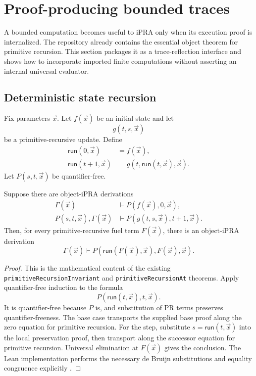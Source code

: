 \section{Proof-producing bounded traces}
\label{sec:traces}

A bounded computation becomes useful to iPRA only when its execution proof is internalized.  The repository already contains the essential object theorem for primitive recursion.  This section packages it as a trace-reflection interface and shows how to incorporate imported finite computations without asserting an internal universal evaluator.

\subsection{Deterministic state recursion}

Fix parameters \(\vec{x}\).  Let \(f(\vec{x})\) be an initial state and let
\[
 g(t,s,\vec{x})
\]
be a primitive-recursive update.  Define
\begin{align*}
 \mathsf{run}(0,\vec{x}) &= f(\vec{x}),\\
 \mathsf{run}(t+1,\vec{x}) &= g(t,\mathsf{run}(t,\vec{x}),\vec{x}).
\end{align*}
Let \(P(s,t,\vec{x})\) be quantifier-free.

\begin{theorem}
\label{thm:trace-invariant}
Suppose there are object-iPRA derivations
\begin{align*}
 \Gamma(\vec{x}) &\vdash P(f(\vec{x}),0,\vec{x}),\\
 P(s,t,\vec{x}),\Gamma(\vec{x})
 &\vdash P(g(t,s,\vec{x}),t+1,\vec{x}).
\end{align*}
Then, for every primitive-recursive fuel term \(F(\vec{x})\), there is an object-iPRA derivation
\[
 \Gamma(\vec{x})\vdash
 P(\mathsf{run}(F(\vec{x}),\vec{x}),F(\vec{x}),\vec{x}).
\]
\end{theorem}

\begin{proof}
This is the mathematical content of the existing \texttt{primitiveRecursionInvariant} and \texttt{primitiveRecursionAt} theorems.  Apply quantifier-free induction to the formula
\[
 P(\mathsf{run}(t,\vec{x}),t,\vec{x}).
\]
It is quantifier-free because \(P\) is, and substitution of PR terms preserves quantifier-freeness.  The base case transports the supplied base proof along the zero equation for primitive recursion.  For the step, substitute \(s=\mathsf{run}(t,\vec{x})\) into the local preservation proof, then transport along the successor equation for primitive recursion.  Universal elimination at \(F(\vec{x})\) gives the conclusion.  The Lean implementation performs the necessary de Bruijn substitutions and equality congruence explicitly \cite{repo-local-global}.
\end{proof}

